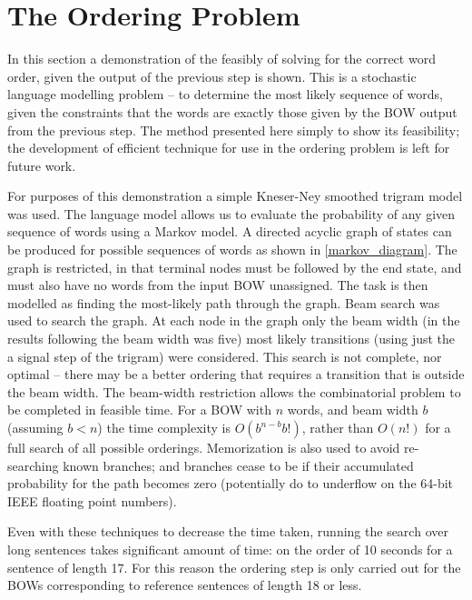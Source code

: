 \documentclass[]{scrartcl}
\numberwithin{equation}{section}
\numberwithin{figure}{section}
\theoremstyle{plain}
\theoremstyle{definition}
\begin{document}
\section{The Ordering Problem} \label{ordering}
In this section a demonstration of the feasibly of solving for the correct word order, given the output of the previous step is shown. This is a stochastic language modelling problem -- to determine the most likely sequence of words, given the constraints that the words are exactly those given by the BOW output from the previous step. The method presented here simply to show its feasibility; the development of efficient technique for use in the ordering problem is left for future work.


For purposes of this demonstration a simple Kneser-Ney smoothed trigram model \parencite{kneser1995improved} was used. The language model allows us to evaluate the probability of any given sequence of words using a Markov model.
A directed acyclic graph of states can be produced for possible sequences of words as shown in \cref{markov_diagram}. The graph is restricted, in that terminal nodes must be followed by the end state, and must also have no words from the input BOW unassigned. The task is then modelled as finding the most-likely path through the graph.
Beam search was used to search the graph. At each node in the graph only the beam width (in the results following the beam width was five) most likely transitions (using just the a signal step of the trigram) were considered. This search is not complete, nor optimal -- there may be a better ordering that requires a transition that is outside the beam width. The beam-width restriction allows the combinatorial problem to be completed in feasible time. For a BOW with $n$ words, and beam width $b$ (assuming $b<n$) the time complexity is $O(b^{n-b}b!)$, rather than $O(n!)$ for a full search of all possible orderings. Memorization is also used to avoid re-searching known branches; and branches cease to be  if their accumulated probability for the path becomes zero (potentially do to underflow on the 64-bit IEEE floating point numbers).

Even with these techniques to decrease the time taken, running the search over long sentences takes significant amount of time: on the order of 10 seconds for a sentence of length 17. For this reason the ordering step is only carried out for the BOWs corresponding to reference sentences of length 18 or less. 
  
\end{document}
